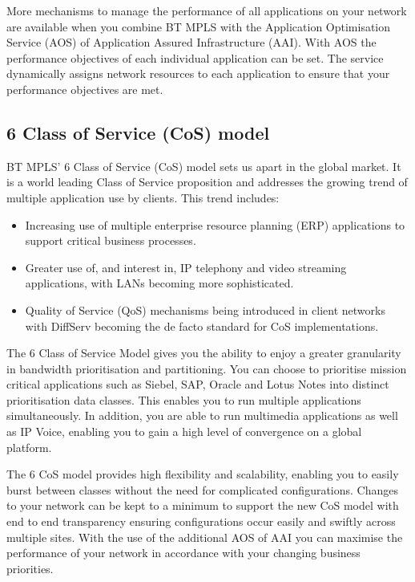 More mechanisms to manage the performance of all applications on your network are available when you combine BT MPLS with the Application Optimisation Service (AOS) of Application Assured Infrastructure (AAI). With AOS the performance objectives of each individual application can be set. The service dynamically assigns network resources to each application to ensure that your performance objectives are met.

\subsection{6 Class of Service (CoS) model}
BT MPLS' 6 Class of Service (CoS) model sets us apart in the global market. It is a world leading Class of Service proposition and addresses the growing trend of multiple application use by clients. This trend includes:

\begin{itemize}
\item Increasing use of multiple enterprise resource planning (ERP) applications to support critical business processes.
\item Greater use of, and interest in, IP telephony and video streaming applications, with LANs becoming more sophisticated.
\item Quality of Service (QoS) mechanisms being introduced in client networks with DiffServ becoming the de facto standard for CoS implementations.
\end{itemize}

The 6 Class of Service Model gives you the ability to enjoy a greater granularity in bandwidth prioritisation and partitioning. You can choose to prioritise mission critical applications such as Siebel, SAP, Oracle and Lotus Notes into distinct prioritisation data classes. This enables you to run multiple applications simultaneously. In addition, you are able to run multimedia applications as well as IP Voice, enabling you to gain a high level of convergence on a global platform.

The 6 CoS model provides high flexibility and scalability, enabling you to easily burst between classes without the need for complicated configurations. Changes to your network can be kept to a minimum to support the new CoS model with end to end transparency ensuring configurations occur easily and swiftly across multiple sites. With the use of the additional AOS of AAI you can maximise the performance of your network in accordance with your changing business priorities.

